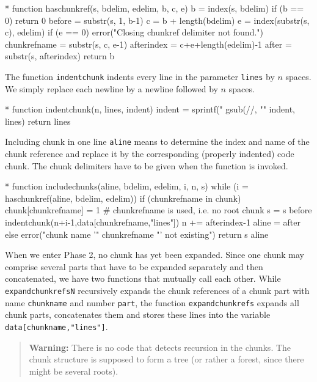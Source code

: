 \documentclass[a4paper]{article} %
\begin{document}
\begin{chunk}{*}
function haschunkref(s, bdelim, edelim,   b, c, e) {
  b = index(s, bdelim)
  if (b == 0) { return 0 }
  before = substr(s, 1, b-1)
  c = b + length(bdelim)
  e = index(substr(s, c), edelim)
  if (e == 0) {
    error("Closing chunkref delimiter not found.")
  }
  chunkrefname = substr(s, c, e-1)
  afterindex = c+e+length(edelim)-1
  after = substr(s, afterindex)
  return b
}
\end{chunk}

The function \texttt{indentchunk} indents every line in the parameter
\texttt{lines} by $n$ spaces. We simply replace each newline by a
newline followed by $n$ spaces.
\begin{chunk}{*}
function indentchunk(n, lines,   indent) {
  indent = sprintf("%
  gsub(/\n/, "\n" indent, lines)
  return lines
}
\end{chunk}

Including chunk in one line \texttt{aline} means to determine the
index and name of the chunk reference and replace it by the
corresponding (properly indented) code chunk. The chunk delimiters
have to be given when the function is invoked.
\begin{chunk}{*}
function includechunks(aline, bdelim, edelim,   i, n, s) {
  while (i = haschunkref(aline, bdelim, edelim)) {
    if (chunkrefname in chunk) {
      chunk[chunkrefname] = 1 # chunkrefname is used, i.e. no root chunk
      s = s before indentchunk(n+i-1,data[chunkrefname,"lines"])
      n += afterindex-1
      aline = after
    } else {
      error("chunk name '" chunkrefname "' not existing")
    }
  }
  return s aline
}
\end{chunk}

When we enter Phase 2, no chunk has yet been expanded. Since one chunk
may comprise several parts that have to be expanded separately and
then concatenated, we have two functions that mutually call each
other. While \texttt{expandchunkrefsN} recursively expands the chunk
references of a chunk part with name \texttt{chunkname} and number
\texttt{part}, the function \texttt{expandchunkrefs} expands all chunk
parts, concatenates them and stores these lines into the variable
\texttt{data[chunkname,"lines"]}.

\begin{quote}
  \textbf{Warning:} There is no code that detects recursion in the
    chunks. The chunk structure is supposed to form a tree (or rather
    a forest, since there might be several roots).
\end{quote}
\end{document}
